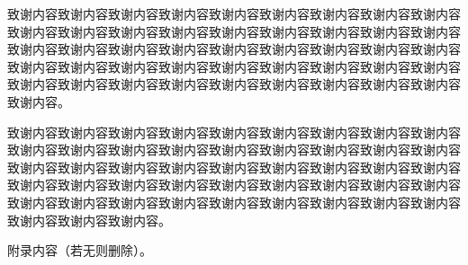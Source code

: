 \documentclass[twoside]{thesis-cls-Miya} %
\begin{document}


致谢内容致谢内容致谢内容致谢内容致谢内容致谢内容致谢内容致谢内容致谢内容致谢内容致谢内容致谢内容致谢内容致谢内容致谢内容致谢内容致谢内容致谢内容致谢内容致谢内容致谢内容致谢内容致谢内容致谢内容致谢内容致谢内容致谢内容致谢内容致谢内容致谢内容致谢内容致谢内容致谢内容致谢内容致谢内容致谢内容致谢内容致谢内容致谢内容致谢内容致谢内容致谢内容致谢内容致谢内容致谢内容致谢内容。

致谢内容致谢内容致谢内容致谢内容致谢内容致谢内容致谢内容致谢内容致谢内容致谢内容致谢内容致谢内容致谢内容致谢内容致谢内容致谢内容致谢内容致谢内容致谢内容致谢内容致谢内容致谢内容致谢内容致谢内容致谢内容致谢内容致谢内容致谢内容致谢内容致谢内容致谢内容致谢内容致谢内容致谢内容致谢内容致谢内容致谢内容致谢内容致谢内容致谢内容致谢内容致谢内容致谢内容致谢内容致谢内容致谢内容致谢内容致谢内容。

附录内容（若无则删除）。
\end{document}
